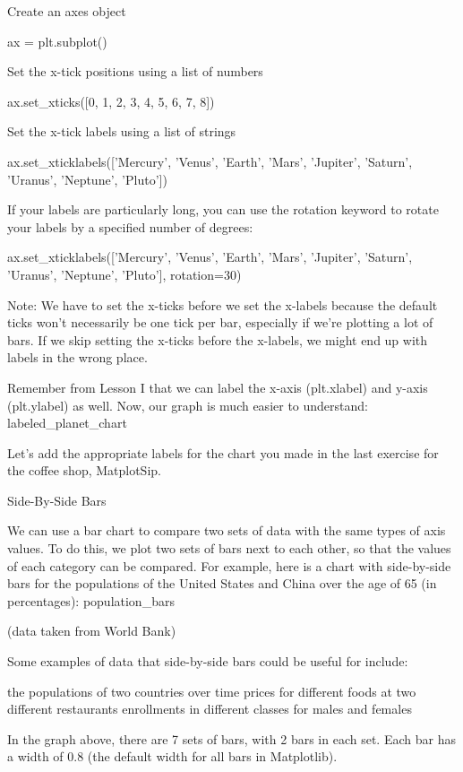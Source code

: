 \documentclass{journal}
\begin{document}
    Create an axes object

    ax = plt.subplot()

    Set the x-tick positions using a list of numbers

    ax.set_xticks([0, 1, 2, 3, 4, 5, 6, 7, 8])

    Set the x-tick labels using a list of strings

    ax.set_xticklabels(['Mercury', 'Venus', 'Earth', 'Mars', 'Jupiter', 'Saturn', 'Uranus', 'Neptune', 'Pluto'])

    If your labels are particularly long, you can use the rotation keyword to rotate your labels by a specified number of degrees:

    ax.set_xticklabels(['Mercury', 'Venus', 'Earth', 'Mars', 'Jupiter', 'Saturn', 'Uranus', 'Neptune', 'Pluto'],
    rotation=30)

Note: We have to set the x-ticks before we set the x-labels because the default ticks won’t necessarily be one tick per bar, especially if we’re plotting a lot of bars. If we skip setting the x-ticks before the x-labels, we might end up with labels in the wrong place.

Remember from Lesson I that we can label the x-axis (plt.xlabel) and y-axis (plt.ylabel) as well. Now, our graph is much easier to understand: labeled_planet_chart

Let’s add the appropriate labels for the chart you made in the last exercise for the coffee shop, MatplotSip.


Side-By-Side Bars

We can use a bar chart to compare two sets of data with the same types of axis values. To do this, we plot two sets of bars next to each other, so that the values of each category can be compared. For example, here is a chart with side-by-side bars for the populations of the United States and China over the age of 65 (in percentages): population_bars

(data taken from World Bank)

Some examples of data that side-by-side bars could be useful for include:

    the populations of two countries over time
    prices for different foods at two different restaurants
    enrollments in different classes for males and females

In the graph above, there are 7 sets of bars, with 2 bars in each set. Each bar has a width of 0.8 (the default width for all bars in Matplotlib).
\end{document}
